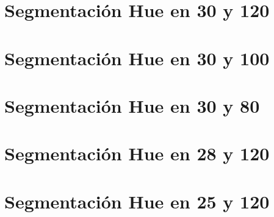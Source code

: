 \section{Segmentación Hue en 30 y 120}


\section{Segmentación Hue en 30 y 100}


\section{Segmentación Hue en 30 y 80}


\section{Segmentación Hue en 28 y 120}


\section{Segmentación Hue en 25 y 120}
